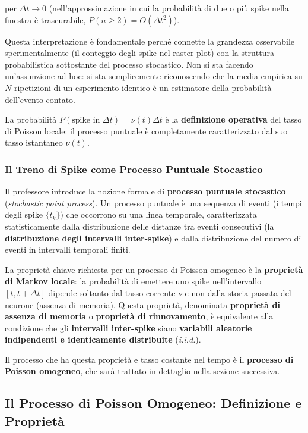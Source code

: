 per $\Delta t \to 0$ (nell'approssimazione in cui la probabilità di due o più spike nella finestra è trascurabile, $P(n \geq 2) = O(\Delta t^2)$).

Questa interpretazione è fondamentale perché connette la grandezza osservabile sperimentalmente (il conteggio degli spike nel raster plot) con la struttura probabilistica sottostante del processo stocastico. Non si sta facendo un'assunzione ad hoc: si sta semplicemente riconoscendo che la media empirica su $N$ ripetizioni di un esperimento identico è un estimatore della probabilità dell'evento contato.

La probabilità $P(\text{spike in } \Delta t) = \nu(t) \Delta t$ è la \textbf{definizione operativa} del tasso di Poisson locale: il processo puntuale è completamente caratterizzato dal suo tasso istantaneo $\nu(t)$.

\subsubsection{Il Treno di Spike come Processo Puntuale Stocastico}

Il professore introduce la nozione formale di \textbf{processo puntuale stocastico} (\textit{stochastic point process}). Un processo puntuale è una sequenza di eventi (i tempi degli spike $\{t_k\}$) che occorrono su una linea temporale, caratterizzata statisticamente dalla distribuzione delle distanze tra eventi consecutivi (la \textbf{distribuzione degli intervalli inter-spike}) e dalla distribuzione del numero di eventi in intervalli temporali finiti.

La proprietà chiave richiesta per un processo di Poisson omogeneo è la \textbf{proprietà di Markov locale}: la probabilità di emettere uno spike nell'intervallo $[t, t+\Delta t]$ dipende soltanto dal tasso corrente $\nu$ e non dalla storia passata del neurone (assenza di memoria). Questa proprietà, denominata \textbf{proprietà di assenza di memoria} o \textbf{proprietà di rinnovamento}, è equivalente alla condizione che gli \textbf{intervalli inter-spike} siano \textbf{variabili aleatorie indipendenti e identicamente distribuite} (\textit{i.i.d.}).

Il processo che ha questa proprietà e tasso costante nel tempo è il \textbf{processo di Poisson omogeneo}, che sarà trattato in dettaglio nella sezione successiva.


\subsection{Il Processo di Poisson Omogeneo: Definizione e Proprietà}

